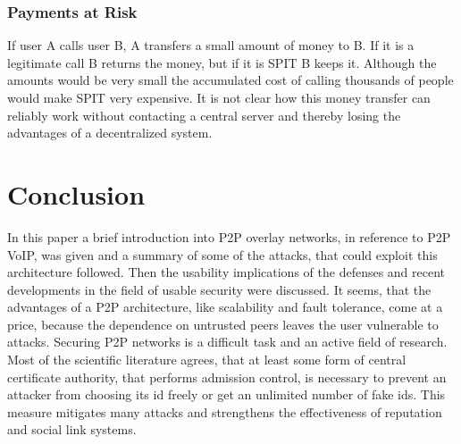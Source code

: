 \documentclass[a4paper,10pt]{article}
\begin{document}
\subsubsection{Payments at Risk}
If user A calls user B, A transfers a small amount of money to B. If it is a
legitimate call B returns the money, but if it is SPIT B keeps it. Although
the amounts would be very small the accumulated cost of calling thousands of
people would make SPIT very expensive. It is not clear how this money transfer
can reliably work without contacting a central server and thereby losing the
advantages of a decentralized system.

\section{Conclusion}
\label{conclusion}
In this paper a brief introduction into P2P overlay networks, in reference to
P2P VoIP, was given and a summary of some of the attacks, that could exploit
this
architecture followed. Then the usability implications of the defenses and
recent developments in the field of usable security were discussed. It seems,
that
the advantages of a P2P architecture, like scalability and fault tolerance, come
at a price, because the dependence on untrusted peers leaves the user
vulnerable to attacks. Securing P2P networks is a difficult task and an active
field of research. Most of the scientific literature agrees, that at least
some form of central certificate authority, that performs admission control, is
necessary to prevent an attacker from choosing its id freely or get an unlimited
number of fake ids. This measure mitigates many attacks and strengthens the
effectiveness of reputation and social link systems.



\end{document}
